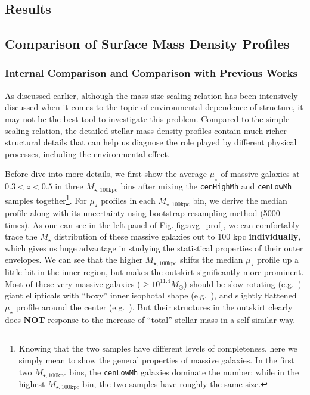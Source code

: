 \documentclass{emulateapj}
\def\rbcg{\texttt{cenHighMh}}
\def\nbcg{\texttt{cenLowMh}}
\def\mstar{{$M_{\star}$}}
\def\mtot{{$M_{\star,100\mathrm{kpc}}$}}
\def\mden{{$\mu_{\star}$}}
\newcommand{\update}[1]{\textcolor{Bittersweet}{#1}}
\begin{document}
\begin{CJK*}{UTF8}{gbsn}

\section{Results}
    \label{sec:result}
    
\subsection{Comparison of Surface Mass Density Profiles}
    \label{ssec:sbp_compare}

\subsubsection{Internal Comparison and Comparison with Previous Works}
    \label{sssec:sbp_inter}
        
    As discussed earlier, although the mass-size scaling relation has been intensively 
    discussed when it comes to the topic of environmental dependence of structure, 
    it may not be the best tool to investigate this problem.    
    Compared to the simple scaling relation, the detailed stellar mass density profiles 
    contain much richer structural details that can help us diagnose the role played by 
    different physical processes, including the environmental effect.  
    
    \update{
    Before dive into more details, we first show the average \mden{} of massive galaxies 
    at $0.3 < z < 0.5$ in three \mtot{} bins after mixing the \rbcg{} and \nbcg{} 
    samples together\footnote{Knowing that the two samples have different levels of 
    completeness, here we simply mean to show the general properties of massive galaxies.
    In the first two \mtot{} bins, the \nbcg{} galaxies dominate the number; while in
    the highest \mtot{} bin, the two samples have roughly the same size.}.   
    For \mden{} profiles in each \mtot{} bin, we derive the median profile along with its 
    uncertainty using bootstrap resampling method (5000 times). 
    As one can see in the left panel of Fig.\ref{fig:avg_prof}, we can comfortably trace 
    the \mstar{} distribution of these massive galaxies out to 100 kpc 
    \textbf{individually}, which gives us huge advantage in studying the statistical 
    properties of their outer envelopes. 
    We can see that the higher \mtot{} shifts the median \mden{} profile up a little bit 
    in the inner region, but makes the outskirt significantly more prominent. 
    Most of these very massive galaxies ($\ge 10^{11.4} M_{\odot}$) should be 
    slow-rotating (e.g.\ \citealt{Cappellari13b}) giant ellipticals with ``boxy'' inner 
    isophotal shape (e.g.\ \citealt{Kormendy2009}), and slightly flattened \mden{} profile 
    around the center (e.g.\ \citealt{Lauer07}).
    But their structures in the outskirt clearly does \textbf{NOT} response to the 
    increase of ``total'' stellar mass in a self-similar way.}
        

\end{CJK*}
\end{document}
